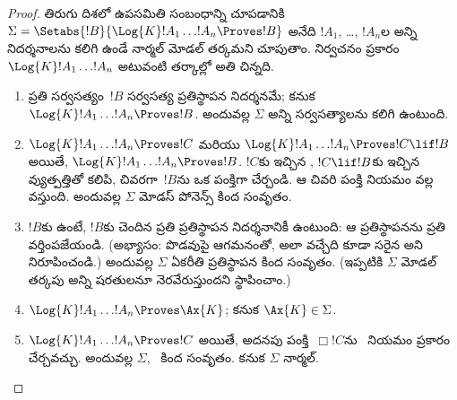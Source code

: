 \documentclass[../../../include/open-logic-section]{subfiles}
\begin{document}
\begin{proof}
  తిరుగు దిశలో ఉపసమితి సంబంధాన్ని చూపడానికి
  $\Sigma = \Setabs{!B}{\Log{K} !A_1 \dots !A_n \Proves !B }$
  అనేది $!A_1$, \dots, $!A_n$ల అన్ని నిదర్శనాలను కలిగి ఉండే
  నార్మల్ మోడల్ తర్కమని చూపుతాం. నిర్వచనం ప్రకారం
  $\Log{K} !A_1 \dots !A_n$ అటువంటి తర్కాల్లో అతి చిన్నది.
  \begin{enumerate}
    \item ప్రతి సర్వసత్యం~$!B$ సర్వసత్య ప్రతిస్థాపన నిదర్శనమే;
      కనుక $\Log{K}!A_1\dots!A_n \Proves !B$. అందువల్ల $\Sigma$
      అన్ని సర్వసత్యాలను కలిగి ఉంటుంది.
    \item $\Log{K}!A_1\dots!A_n \Proves !C$ మరియు
      $\Log{K}!A_1\dots!A_n \Proves !C \lif !B$ అయితే,
      $\Log{K}!A_1\dots!A_n \Proves !B$. $!C$కు ఇచ్చిన
      , $!C \lif !B$కు ఇచ్చిన
      వ్యుత్పత్తితో కలిపి, చివరగా~$!B$ను ఒక పంక్తిగా చేర్చండి.
      ఆ చివరి పంక్తి \MP{} నియమం వల్ల వస్తుంది. అందువల్ల $\Sigma$
      మోడస్ పోనెన్స్ కింద సంవృతం.
    \item $!B$కు  ఉంటే,
      $!B$కు చెందిన ప్రతి ప్రతిస్థాపన నిదర్శనానికీ
       ఉంటుంది:
      ఆ ప్రతిస్థాపనను 
      ప్రతి  వర్తింపజేయండి.
      (అభ్యాసం:  పొడవుపై
      ఆగమనంతో, అలా వచ్చేది కూడా సరైన
       అని నిరూపించండి.)
      అందువల్ల $\Sigma$ ఏకరీతి ప్రతిస్థాపన కింద సంవృతం.
      (ఇప్పటికి $\Sigma$ మోడల్ తర్కపు అన్ని షరతులనూ
      నెరవేరుస్తుందని స్థాపించాం.)
    \item $\Log{K}!A_1\dots!A_n \Proves \Ax{K}$;
      కనుక $\Ax{K} \in \Sigma$.
    \item $\Log{K}!A_1\dots!A_n \Proves !C$ అయితే,
      అదనపు పంక్తి~$\Box !C$ను~\Nec{} నియమం ప్రకారం చేర్చవచ్చు.
      అందువల్ల $\Sigma$,~\Nec{} కింద సంవృతం. కనుక
      $\Sigma$ నార్మల్.
  \end{enumerate}
\end{proof}
\end{document}
